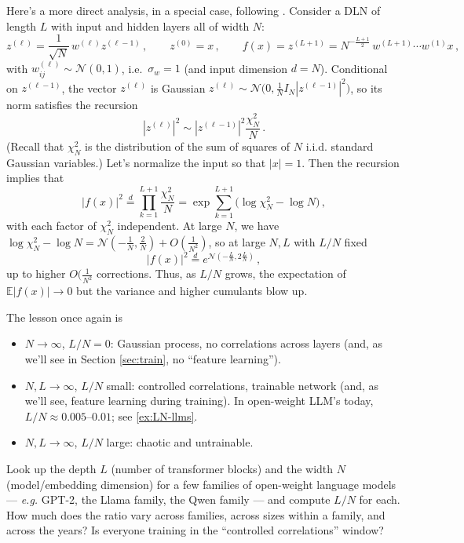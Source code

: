 \documentclass[11pt]{article}
\newcommand{\E}{\mathbb{E}}
\newcommand{\CN}{{\mathcal N}}
\begin{document}
Here's a more direct analysis, in a special case, following \cite[Lecture 2]{hanin2026mdl}. 
Consider a DLN of length $L$ with input and hidden layers all of width $N$:
%
\begin{equation}
    z^{(\ell)} = \frac{1}{\sqrt N}\,w^{(\ell)}z^{(\ell-1)}\,,\qquad z^{(0)}=x\,,\qquad  f(x)=z^{(L+1)}=N^{-\frac{L+1}{2}}\,w^{(L+1)}\cdots w^{(1)}x\,,
\end{equation}
%
with $w_{ij}^{(\ell)}\sim \CN(0,1)$, i.e.\ $\sigma_w=1$ (and input dimension $d=N$).
Conditional on $z^{(\ell-1)}$, the vector $z^{(\ell)}$ is Gaussian $z^{(\ell)}\sim \CN\big(0,\frac{1}{N} I_N |z^{(\ell-1)}|^2\big)$, so its norm satisfies the recursion
%
\begin{equation}|z^{(\ell)}|^2 \sim |z^{(\ell-1)}|^2 \frac{\chi^2_N}{N}\,.
\end{equation}
%
(Recall that $\chi^2_N$ is the distribution of the sum of squares of $N$ i.i.d. standard Gaussian variables.)
Let's normalize the input so that $|x|=1$. Then the recursion implies that 
%
\begin{equation} |f(x)|^2  \overset{d}{=} \prod_{k=1}^{L+1} \frac{\chi^2_N}{N} = \exp\sum_{k=1}^{L+1} \big(\log \chi^2_N-\log N\big)\,,
\end{equation}
%
with each factor of $\chi^2_N$ independent. At large $N$, we have $\log \chi_N^2-\log N = \CN(-\frac{1}{N},\frac{2}{N})+O(\frac{1}{N^2})$, so at large $N,L$ with $L/N$ fixed
%
\begin{equation}
    |f(x)|^2 \overset{d}= e^{\textstyle \CN(-\frac{L}{N},2\frac{L}{N})}\,,
\end{equation}
%
up to higher $O(\frac{1}{N^2}$ corrections. Thus, as $L/N$ grows, the expectation of $\E|f(x)|\to 0$ but the variance and higher cumulants blow up.

The lesson once again is
\begin{itemize}
\item $N\to \infty$, $L/N=0$: Gaussian process, no correlations across layers (and, as we'll see in Section \ref{sec:train}, no ``feature learning'').
\item $N,L\to \infty$, $L/N$ small: controlled correlations, trainable network (and, as we'll see, feature learning during training). In open-weight LLM's today, $L/N\approx 0.005$--$0.01$; see \cref{ex:LN-llms}.
\item $N,L\to\infty$, $L/N$ large: chaotic and untrainable.
\end{itemize}

\begin{exercise}
\label{ex:LN-llms}
\important
Look up the depth $L$ (number of transformer blocks) and the width $N$ (model/embedding dimension) for a few families of open-weight language models --- \emph{e.g.} GPT-2, the Llama family, the Qwen family --- and compute $L/N$ for each. How much does the ratio vary across families, across sizes within a family, and across the years? Is everyone training in the ``controlled correlations'' window?
\end{exercise}
\end{document}
